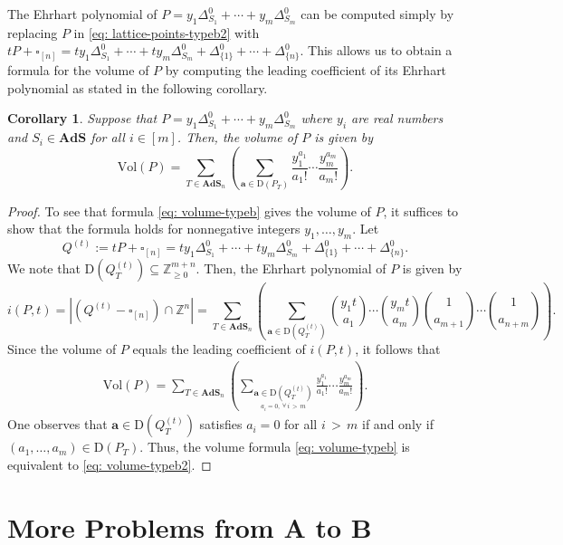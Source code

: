 \documentclass[12pt,reqno]{article}%
\newtheorem{cor}[thm]{Corollary}
\theoremstyle{definition}
\numberwithin{equation}{section}
\newcommand{\vol}{\mathrm{Vol}}
\newcommand{\bba}{\mathbf{a}}
\newcommand{\Z}{\mathbb Z}
\newcommand{\ads}{\mathbf{AdS}}
\newcommand{\sym}{\Delta^0}
\begin{document}
The Ehrhart polynomial of $P = y_1\Delta^0_{S_1} + \cdots + y_m\Delta^0_{S_m}$ can be computed simply by replacing $P$ in \eqref{eq: lattice-points-typeb2} with $tP + \square_{[n]} = ty_1\Delta^0_{S_1} + \cdots + ty_m\Delta^0_{S_m} + \sym_{\{1\}} + \cdots + \sym_{\{n\}}$. This allows us to obtain a formula for the volume of $P$ by computing the leading coefficient of its Ehrhart polynomial as stated in the following corollary.
\begin{cor}\label{cor: volume-typeb}
    Suppose that $P = y_1\Delta^0_{S_1} + \cdots + y_m\Delta^0_{S_m}$ where $y_i$ are real numbers and $S_i \in \ads$ for all $i \in [m]$. Then, the volume of $P$ is given by
    \vspace{-0.5cm}\begin{equation}\label{eq: volume-typeb}
    \vol(P) = \sum_{T \in \ads_n}\left(\sum_{\bba \in \mathrm{D}(P_T)}\frac{y_1^{a_1}}{a_1!}\cdots \frac{y_m^{a_m}}{a_m!}\right).
\end{equation}
\end{cor}

\begin{proof}
    To see that formula \eqref{eq: volume-typeb} gives the volume of $P$, it suffices to show that the formula holds for nonnegative integers $y_1, \dots, y_m$. Let $$Q^{(t)} := tP + \square_{[n]} = ty_1\Delta^0_{S_1} + \cdots + ty_m\Delta^0_{S_m} + \sym_{\{1\}} + \cdots + \sym_{\{n\}}.$$ We note that $\mathrm{D}(Q^{(t)}_T) \subseteq \Z^{m+n}_{\geq 0}$. Then, the Ehrhart polynomial of $P$ is given by
    \[i(P,t) = |(Q^{(t)} - \square_{[n]})\cap \Z^n| = \sum_{T \in \ads_n}\left(\sum_{\bba \in \mathrm{D}(Q^{(t)}_T)}\binom{y_1t}{a_1}\cdots \binom{y_mt}{a_m}\binom{1}{a_{m+1}}\cdots \binom{1}{a_{n+m}}\right).\]
    Since the volume of $P$ equals the leading coefficient of $i(P,t)$, it follows that
    \begin{align}\label{eq: volume-typeb2}
        \vol(P) = \sum_{T \in \ads_n}\left(\sum_{\underset{a_{i} = 0, \ \forall\, i\, >\, m}{\bba \in \mathrm{D}(Q^{(t)}_T)}}\frac{y_1^{a_1}}{a_1!}\cdots \frac{y_m^{a_m}}{a_m!}\right).
    \end{align}
    One observes that $\bba \in \mathrm{D}(Q^{(t)}_T)$ satisfies $a_{i} = 0$ for all $i\, >\, m$ if and only if $(a_1, \dots, a_m) \in \mathrm{D}(P_T)$. Thus, the volume formula \eqref{eq: volume-typeb} is equivalent to \eqref{eq: volume-typeb2}.
\end{proof}

\section{More Problems from A to B}
\end{document}
